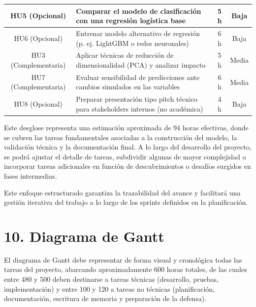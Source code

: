\documentclass[
11pt, %
]{charter}
\begin{document}
\begin{table}[htpb]
\begin{tabularx}{\linewidth}{@{}|c|X|c|c|@{}}
HU5 (Opcional) & Comparar el modelo de clasificación con una regresión logística base & 5 h & Baja \\ \hline
HU6 (Opcional) & Entrenar modelo alternativo de regresión (p. ej. LightGBM o redes neuronales) & 6 h & Baja \\ \hline
HU3 (Complementaria) & Aplicar técnicas de reducción de dimensionalidad (PCA) y analizar impacto & 5 h & Media \\ \hline
HU7 (Complementaria) & Evaluar sensibilidad de predicciones ante cambios simulados en las variables & 6 h & Media \\ \hline
HU8 (Opcional) & Preparar presentación tipo pitch técnico para stakeholders internos (no académica) & 4 h & Baja \\ \hline
\end{tabularx}
\end{table}

Este desglose representa una estimación aproximada de 94 horas efectivas, donde se cubren las tareas fundamentales asociadas a la construcción del modelo, la validación técnica y la documentación final. A lo largo del desarrollo del proyecto, se podrá ajustar el detalle de tareas, subdividir algunas de mayor complejidad o incorporar tareas adicionales en función de descubrimientos o desafíos surgidos en fases intermedias.

Este enfoque estructurado garantiza la trazabilidad del avance y facilitará una gestión iterativa del trabajo a lo largo de los sprints definidos en la planificación.

\section{10. Diagrama de Gantt}
\label{sec:gantt}

El diagrama de Gantt debe representar de forma visual y cronológica todas las tareas del proyecto, abarcando aproximadamente 600 horas totales, de las cuales entre 480 y 500 deben destinarse a tareas técnicas (desarrollo, pruebas, implementación) y entre 100 y 120 a tareas no técnicas (planificación, documentación, escritura de memoria y preparación de la defensa).
\end{document}
